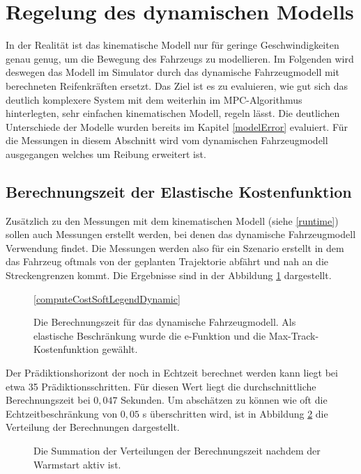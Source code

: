 \documentclass{like}
\begin{document}
\section{Regelung des dynamischen Modells}
\label{dynModelcontrol}
In der Realität ist das kinematische Modell nur für geringe Geschwindigkeiten genau genug, um die Bewegung des Fahrzeugs zu modellieren. Im Folgenden wird deswegen das Modell im Simulator durch das dynamische Fahrzeugmodell mit berechneten Reifenkräften ersetzt. Das Ziel ist es zu evaluieren, wie gut sich das deutlich komplexere System mit dem weiterhin im \ac{MPC}-Algorithmus hinterlegten, sehr einfachen kinematischen Modell, regeln lässt.
Die deutlichen Unterschiede der Modelle wurden bereits im Kapitel \ref{modelError} evaluiert. Für die Messungen in diesem Abschnitt wird vom dynamischen Fahrzeugmodell ausgegangen welches um Reibung erweitert ist.

\subsection{Berechnungszeit der Elastische Kostenfunktion}
 

Zusätzlich zu den Messungen mit dem kinematischen Modell (siehe \ref{runtime}) sollen auch Messungen erstellt werden, bei denen das dynamische Fahrzeugmodell Verwendung findet. Die Messungen werden also für ein Szenario erstellt in dem das Fahrzeug oftmals von der geplanten Trajektorie abfährt und nah an die Streckengrenzen kommt. Die Ergebnisse sind in der Abbildung \ref{fig:computeCostSoftConstDynamic} dargestellt. 

\begin{figure}[ht!]
	\centering
	 
	\ref{computeCostSoftLegendDynamic}
	\caption{Die Berechnungszeit für das dynamische Fahrzeugmodell. Als elastische Be\-schrän\-kung wurde die e-Funktion und die Max-Track-Kostenfunktion gewählt.}
	\label{fig:computeCostSoftConstDynamic}
\end{figure}
Der Prädiktionshorizont der noch in Echtzeit berechnet werden kann liegt bei etwa 35 Prädiktionsschritten. Für diesen Wert liegt die durchschnittliche Berechnungszeit bei $0,047$ Sekunden. Um abschätzen zu können wie oft die Echtzeitbeschränkung von $0,05$ s überschritten wird, ist in Abbildung \ref{fig:computeCostSoftConstDynamicHist} die Verteilung der Berechnungen dargestellt. 

\begin{figure}[ht!]
	\centering
	 
	\caption{Die Summation der Verteilungen der Berechnungszeit nachdem der Warmstart aktiv ist.}
	\label{fig:computeCostSoftConstDynamicHist}
\end{figure}
\end{document}
